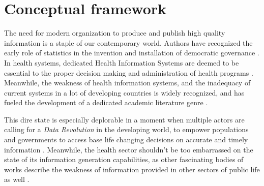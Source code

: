 \section{Conceptual framework}

The need for modern organization to produce and publish high quality information is a staple of our contemporary world. Authors have recognized the early role of statistics in the invention and installation of democratic governance \cite{porter_trust_1996}. In health systems, dedicated Health Information Systems are deemed to be essential to the proper decision making and administration of health programs \cite{abou-zahr_health_2005}. Meanwhile, the weakness of health information systems, and the inadequacy of current systems in a lot of  developing countries is widely recognized, and has fueled the development of a dedicated academic literature genre \cite{abou-zahr_better_2010} \cite{kiberu_strengthening_2014}.

This dire state is especially deplorable in a moment when multiple actors are calling for a \textit{Data Revolution} in the developing world, to empower populations and governments to access  base life changing decisions on accurate and timely information \cite{independent_expert_group_on_a_data_revolution_for_sustainable_development_world_2014} \cite{center_for_global_development_delivering_2014}. Meanwhile, the health sector shouldn't be too embarrassed on the state of its information generation capabilities, as other fascinating bodies of works describe the weakness of information provided in other sectors of public life as well \cite{jerven_poor_2013}.



